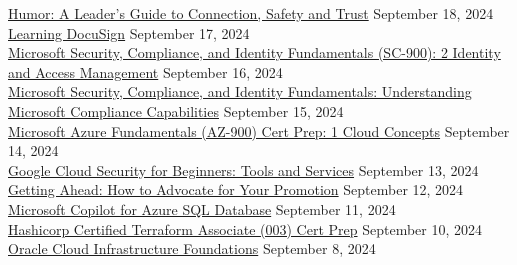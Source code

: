 \documentclass[10pt]{res} %
\begin{document}
\begin{resume}
\href{https://www.linkedin.com/learning/certificates/14016f5b2d3d2f843270fcb4668ce93053669438186c3e1b79b6cedac2758b1c}{\color{blue}Humor: A Leader's Guide to Connection, Safety and Trust} \hfill September 18, 2024 \\
\href{https://www.linkedin.com/learning/certificates/33268e0a31cb4d99584ee2aaa5a49ccd631918e012d4431c9c407ab733523e16}{\color{blue}Learning DocuSign} \hfill September 17, 2024 \\
\href{https://www.linkedin.com/learning/certificates/8938de67f560cc8e9c535b46f40e804b623be7a87bf067a804454dd5cc160580}{\color{blue}Microsoft Security, Compliance, and Identity Fundamentals (SC-900): 2 Identity and Access Management} \hfill September 16, 2024 \\
\href{https://www.linkedin.com/learning/certificates/863c426072c534ab71a07dd65165f3e1fe67f2d1e118cdc6bad5ec95b8ad2f49}{\color{blue}Microsoft Security, Compliance, and Identity Fundamentals: Understanding Microsoft Compliance Capabilities} \hfill September 15, 2024 \\
\href{https://www.linkedin.com/learning/certificates/0cd183d650403e147edb1416ee57b386027104174d914c9378bf34fb54ab94e3}{\color{blue}Microsoft Azure Fundamentals (AZ-900) Cert Prep: 1 Cloud Concepts} \hfill September 14, 2024 \\
\href{https://www.linkedin.com/learning/certificates/e4e0c8ab8a652a3522b13db411636e2e7129c7440284e963baa14ab23b8b40fd}{\color{blue}Google Cloud Security for Beginners: Tools and Services} \hfill September 13, 2024 \\
\href{https://www.linkedin.com/learning/certificates/6241852557bc6e4ffcee5d358c3677662a5d9b26b0bb5f40f8917e01966f8b6c}{\color{blue}Getting Ahead: How to Advocate for Your Promotion} \hfill September 12, 2024 \\
\href{https://www.linkedin.com/learning/certificates/49ccd7d6db3ebba9f8efe8adba83bbfdb65e3298d1f38349c8e0a8b4538bd7d1}{\color{blue}Microsoft Copilot for Azure SQL Database} \hfill September 11, 2024 \\
\href{https://www.linkedin.com/learning/certificates/73212f5f84633ced711f1868aeacec28e9e9e49af8fafad01a35e2b906d7a8e2}{\color{blue}Hashicorp Certified Terraform Associate (003) Cert Prep} \hfill September 10, 2024 \\
\href{https://www.linkedin.com/learning/certificates/6d1e6976eb06c11a635163889bdff5d61eccd51efc0dd2f4cde5561ef766be0f}{\color{blue}Oracle Cloud Infrastructure Foundations} \hfill September 8, 2024 \\

\end{resume}
\end{document}
